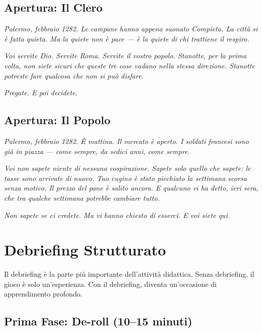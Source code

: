 \subsection{Apertura: Il Clero}

\begin{citbox}
\textit{Palermo, febbraio 1282. Le campane hanno appena suonato
Compieta. La città si è fatta quieta. Ma la quiete non è pace —
è la quiete di chi trattiene il respiro.}

\textit{Voi servite Dio. Servite Roma. Servite il vostro popolo.
Stanotte, per la prima volta, non siete sicuri che queste tre
cose vadano nella stessa direzione. Stanotte potreste fare
qualcosa che non si può disfare.}

\textit{Pregate. E poi decidete.}
\end{citbox}

\subsection{Apertura: Il Popolo}

\begin{citbox}
\textit{Palermo, febbraio 1282. È mattina. Il mercato è aperto.
I soldati francesi sono già in piazza — come sempre, da sedici
anni, come sempre.}

\textit{Voi non sapete niente di nessuna cospirazione. Sapete
solo quello che sapete: le tasse sono arrivate di nuovo. Tuo
cugino è stato picchiato la settimana scorsa senza motivo.
Il prezzo del pane è salito ancora. E qualcuno vi ha detto,
ieri sera, che tra qualche settimana potrebbe cambiare tutto.}

\textit{Non sapete se ci credete. Ma vi hanno chiesto di esserci.
E voi siete qui.}
\end{citbox}

\secsep

\section{Debriefing Strutturato}

Il debriefing è la parte più importante dell'attività didattica.
Senza debriefing, il gioco è solo un'esperienza. Con il debriefing,
diventa un'occasione di apprendimento profondo.

\subsection{Prima Fase: De-roll (10--15 minuti)}

